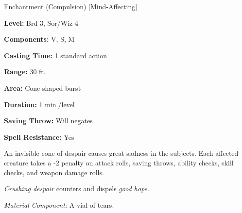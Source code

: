 
Enchantment (Compulsion) [Mind-Affecting]

\textbf{Level:} Brd 3, Sor/Wiz 4

\textbf{Components:} V, S, M

\textbf{Casting Time:} 1 standard action

\textbf{Range:} 30 ft.

\textbf{Area:} Cone-shaped burst

\textbf{Duration:} 1 min./level

\textbf{Saving Throw:} Will negates

\textbf{Spell Resistance:} Yes

An invisible cone of despair causes great sadness in the subjects. Each affected 
creature takes a -2 penalty on attack rolls, saving throws, ability checks, skill 
checks, and weapon damage rolls.

\textit{Crushing despair} counters and dispels \textit{good hope}.

\textit{Material Component:} A vial of tears.

